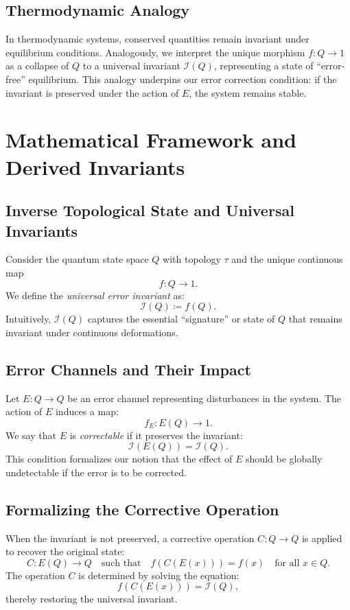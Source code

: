 \documentclass[11pt]{article}
\begin{document}
\subsection{Thermodynamic Analogy}
In thermodynamic systems, conserved quantities remain invariant under equilibrium conditions. Analogously, we interpret the unique morphism \(f: Q\to 1\) as a collapse of \(Q\) to a universal invariant \(\mathcal{I}(Q)\), representing a state of “error-free” equilibrium. This analogy underpins our error correction condition: if the invariant is preserved under the action of \(E\), the system remains stable.

\section{Mathematical Framework and Derived Invariants}
\label{sec:framework}

\subsection{Inverse Topological State and Universal Invariants}
Consider the quantum state space \(Q\) with topology \(\tau\) and the unique continuous map
\[
f: Q \to 1.
\]
We define the \emph{universal error invariant} as:
\[
\mathcal{I}(Q) \coloneqq f(Q).
\]
Intuitively, \(\mathcal{I}(Q)\) captures the essential “signature” or state of \(Q\) that remains invariant under continuous deformations.

\subsection{Error Channels and Their Impact}
Let \(E: Q \to Q\) be an error channel representing disturbances in the system. The action of \(E\) induces a map:
\[
f_E: E(Q) \to 1.
\]
We say that \(E\) is \emph{correctable} if it preserves the invariant:
\[
\mathcal{I}(E(Q)) = \mathcal{I}(Q).
\]
This condition formalizes our notion that the effect of \(E\) should be globally undetectable if the error is to be corrected.

\subsection{Formalizing the Corrective Operation}
When the invariant is not preserved, a corrective operation \(C: Q \to Q\) is applied to recover the original state:
\[
C: E(Q) \to Q \quad \text{such that} \quad f(C(E(x))) = f(x) \quad \text{for all } x \in Q.
\]
The operation \(C\) is determined by solving the equation:
\[
f(C(E(x))) = \mathcal{I}(Q),
\]
thereby restoring the universal invariant.
\end{document}
